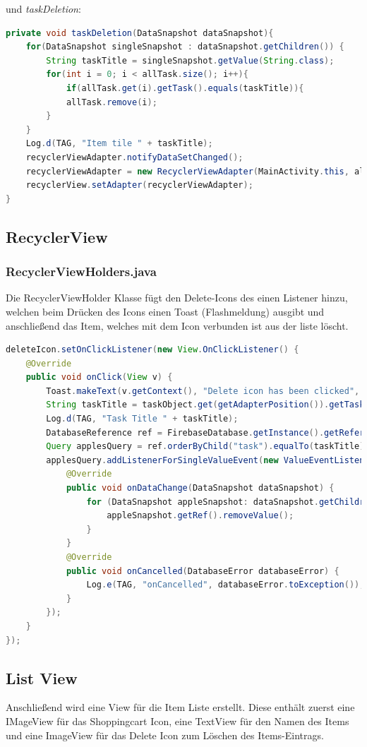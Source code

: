 \clearpage
und \textit{taskDeletion}:

\begin{lstlisting}[language=java]
private void taskDeletion(DataSnapshot dataSnapshot){
	for(DataSnapshot singleSnapshot : dataSnapshot.getChildren()) {
		String taskTitle = singleSnapshot.getValue(String.class);
		for(int i = 0; i < allTask.size(); i++){
			if(allTask.get(i).getTask().equals(taskTitle)){
			allTask.remove(i);
		}
	}
	Log.d(TAG, "Item tile " + taskTitle);
	recyclerViewAdapter.notifyDataSetChanged();
	recyclerViewAdapter = new RecyclerViewAdapter(MainActivity.this, allTask);
	recyclerView.setAdapter(recyclerViewAdapter);
}
\end{lstlisting}

\subsection{RecyclerView}
\subsubsection{RecyclerViewHolders.java}
Die RecyclerViewHolder Klasse fügt den Delete-Icons des einen Listener hinzu, welchen beim Drücken des Icons einen Toast (Flashmeldung) ausgibt und anschließend das Item, welches mit dem Icon verbunden ist aus der liste löscht.
\begin{lstlisting}[language=java]
deleteIcon.setOnClickListener(new View.OnClickListener() {
	@Override
	public void onClick(View v) {
		Toast.makeText(v.getContext(), "Delete icon has been clicked", Toast.LENGTH_LONG).show();
		String taskTitle = taskObject.get(getAdapterPosition()).getTask();
		Log.d(TAG, "Task Title " + taskTitle);
		DatabaseReference ref = FirebaseDatabase.getInstance().getReference();
		Query applesQuery = ref.orderByChild("task").equalTo(taskTitle);
		applesQuery.addListenerForSingleValueEvent(new ValueEventListener() {
			@Override
			public void onDataChange(DataSnapshot dataSnapshot) {
				for (DataSnapshot appleSnapshot: dataSnapshot.getChildren()) {
					appleSnapshot.getRef().removeValue();
				}
			}
			@Override
			public void onCancelled(DatabaseError databaseError) {
				Log.e(TAG, "onCancelled", databaseError.toException());
			}
		});
	}
});
\end{lstlisting}
\clearpage
\subsection{List View}
Anschließend wird eine View für die Item Liste erstellt. Diese enthält zuerst eine IMageView für das Shoppingcart Icon, eine TextView für den Namen des Items und eine ImageView für das Delete Icon zum Löschen des Items-Eintrags.

